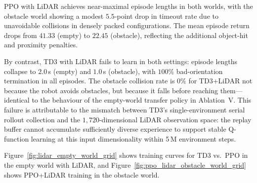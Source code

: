 \documentclass{article}
\begin{document}
PPO with LiDAR achieves near-maximal episode lengths in both worlds, with
the obstacle world showing a modest $5.5$-point drop in timeout rate due to
unavoidable collisions in densely packed configurations.
The mean episode return drops from $41.33$ (empty) to $22.45$ (obstacle),
reflecting the additional object-hit and proximity penalties.

By contrast, TD3 with LiDAR fails to learn in both settings: episode lengths
collapse to $2.0$\,s (empty) and $1.0$\,s (obstacle), with $100\%$
bad-orientation termination in all episodes.
The obstacle collision rate is $0\%$ for TD3+LiDAR not because the robot
avoids obstacles, but because it falls before reaching them—identical to the
behaviour of the empty-world transfer policy in Ablation~V.
This failure is attributable to the mismatch between TD3's single-environment
serial rollout collection and the $1{,}720$-dimensional LiDAR observation
space: the replay buffer cannot accumulate sufficiently diverse experience
to support stable Q-function learning at this input dimensionality within
5\,M environment steps.

Figure~\ref{fig:lidar_empty_world_grid} shows training curves for TD3 vs.\
PPO in the empty world with LiDAR, and
Figure~\ref{fig:ppo_lidar_obstacle_world_grid} shows PPO+LiDAR training in
the obstacle world.
\end{document}
